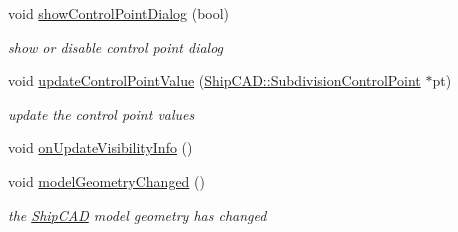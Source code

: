 \begin{DoxyCompactItemize}
void \hyperlink{classShipCAD_1_1Controller_a24cda66f9ccc1c9bc24f8885bcf97255}{show\-Control\-Point\-Dialog} (bool)
\begin{DoxyCompactList}\small\item\em show or disable control point dialog \end{DoxyCompactList}\item 
void \hyperlink{classShipCAD_1_1Controller_a35f446710a96c227f1794eacaef7ba6a}{update\-Control\-Point\-Value} (\hyperlink{classShipCAD_1_1SubdivisionControlPoint}{Ship\-C\-A\-D\-::\-Subdivision\-Control\-Point} $\ast$pt)
\begin{DoxyCompactList}\small\item\em update the control point values \end{DoxyCompactList}\item 
void \hyperlink{classShipCAD_1_1Controller_a73e29a9ddf9e059a5168343099b42ea0}{on\-Update\-Visibility\-Info} ()
\item 
void \hyperlink{classShipCAD_1_1Controller_a55a195bee957f58a12e1d401c119d910}{model\-Geometry\-Changed} ()
\begin{DoxyCompactList}\small\item\em the \hyperlink{namespaceShipCAD}{Ship\-C\-A\-D} model geometry has changed \end{DoxyCompactList}\end{DoxyCompactItemize}
